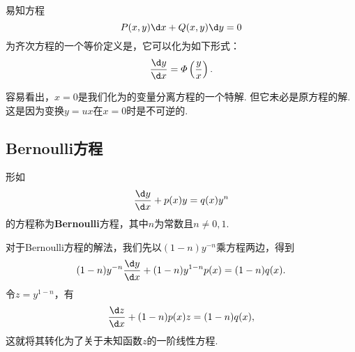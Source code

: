 \documentclass[lang=cn,10pt]{elegantbook}
\begin{document}
\begin{remark}
	易知方程
	$$P(x,y)\d x+Q(x,y)\d y=0$$
	为齐次方程的一个等价定义是，它可以化为如下形式：
	$$\frac{\d y}{\d x}=\varPhi\left(\frac{y}{x}\right).$$
\end{remark}
\begin{remark}
	容易看出，$x=0$是我们化为的变量分离方程的一个特解. 但它未必是原方程的解. 这是因为变换$y=ux$在$x=0$时是不可逆的.
\end{remark}
\subsection{Bernoulli方程}
\begin{definition}[Bernoulli方程]
	形如
	$$\frac{\d y}{\d x}+p(x)y=q(x)y^n$$
	的方程称为\textbf{Bernoulli}{\heiti 方程}，其中$n$为常数且$n\neq 0,1$.
\end{definition}
对于Bernoulli方程的解法，我们先以$(1-n)y^{-n}$乘方程两边，得到
$$(1-n)y^{-n}\frac{\d y}{\d x}+(1-n)y^{1-n}p(x)=(1-n)q(x).$$
令$z=y^{1-n}$，有
$$\frac{\d z}{\d x}+(1-n)p(x)z=(1-n)q(x),$$
这就将其转化为了关于未知函数$z$的一阶线性方程.
\end{document}
